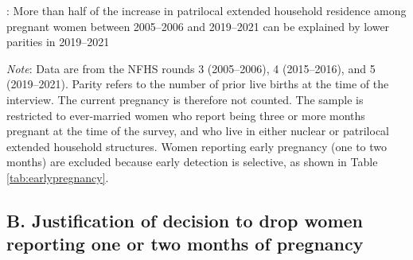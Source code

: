 \documentclass[10pt,twoside,reqno]{article}
\begin{document}
\begin{table}[H]
\sffamily
\caption{: More than half of the increase in patrilocal extended household residence among pregnant women between 2005--2006 and 2019--2021 can be explained by lower parities in 2019--2021}
\label{tab:decomposition_parity}
\vspace{-4pt}

\begin{center}
\begin{scriptsize}
\begin{adjustbox}{max width=\textheight, max totalheight=\textwidth, keepaspectratio}
\setlength{\tabcolsep}{4pt}
\renewcommand{\arraystretch}{1.3}

\end{adjustbox}
\end{scriptsize}
\end{center}

\vspace{1ex}
\small\scriptsize{\textsf{\textit{Note}: Data are from the NFHS rounds 3 (2005--2006), 4 (2015--2016), and 5 (2019--2021).}}
\newline\small\scriptsize{\textsf{Parity refers to the number of prior live births at the time of the interview.  The current pregnancy is therefore not counted.}}
\newline\small\scriptsize{\textsf{The sample is restricted to ever-married women who report being three or more months pregnant at the time of the survey, and who live in either nuclear or patrilocal extended household structures. Women reporting early pregnancy (one to two months) are excluded because early detection is selective, as shown in Table \ref{tab:earlypregnancy}. }}

\end{table}


\clearpage
\renewcommand{\thesection}{B-\arabic{section}}
\setcounter{equation}{0}
\renewcommand{\theequation}{B-\arabic{equation}}
\setcounter{figure}{0}
\renewcommand{\thefigure}{B-\arabic{figure}}
\setcounter{table}{0}
\renewcommand{\thetable}{B-\arabic{table}}

\subsection*{B. Justification of decision to drop women reporting one or two months of pregnancy} \label{sec:dropearlypregnancy}
\end{document}
